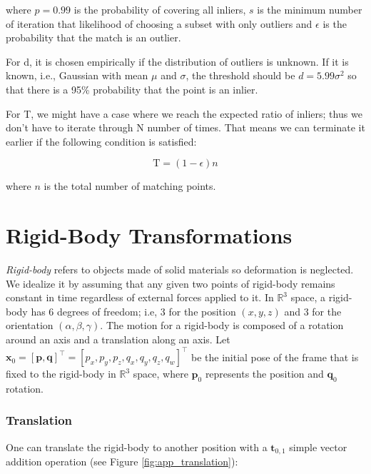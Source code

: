 \documentclass[a4paper]{report}
\numberwithin{figure}{section}
\newcommand{\R}{\mathbb{R}}
\begin{document}
\begin{appendices}
where $p=0.99$ is the probability of covering all inliers, $s$ is the minimum 
number of iteration that likelihood of choosing a subset with only outliers 
and $\epsilon$ is the probability that the match is an outlier.

For d, it is chosen empirically if the distribution of outliers is unknown. If 
it is known, i.e., Gaussian with mean $\mu$ and $\sigma$, the threshold should 
be $d=5.99\sigma^2$ so that there is a 95\% probability that the point is an 
inlier.

For T, we might have a case where we reach the expected ratio of inliers; thus 
we don't have to iterate through N number of times. That means we can 
terminate it earlier if the following condition is satisfied:

\begin{equation}
\text{T} = (1-\epsilon)n
\end{equation}

where $n$ is the total number of matching points.

\section{Rigid-Body Transformations} \label{sc_rigid_body_transformations}

\textit{Rigid-body} refers to objects made of solid materials so deformation is 
neglected. We idealize it by assuming that any given two points of 
rigid-body remains constant in time regardless of external forces 
applied to it. In $\R^3$ space, a rigid-body has 6 degrees of freedom; i.e, 
3 for the position $(x, y, z)$ and 3 for the orientation $(\alpha, \beta, \gamma)$.
The motion for a rigid-body is composed of a rotation around an axis and 
a translation along an axis. 
Let
$\mathbf{x}_0=[\mathbf{p}, \mathbf{q}]^\top=[p_x, p_y, p_z, q_x, q_y, 
q_z, q_w]^\top$
be the initial pose of the frame that is fixed to the rigid-body in $\R^3$ space, 
where $\mathbf{p}_0$ represents the position and $\mathbf{q}_0$ rotation.

\subsubsection{Translation}

One can translate the rigid-body to another position with a 
$\mathbf{t}_{0,1}$ simple vector addition operation (see Figure 
\ref{fig:app_translation}):


\end{appendices}
\end{document}
